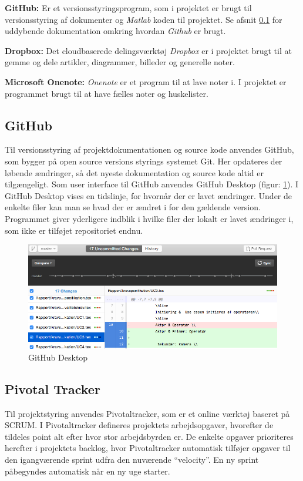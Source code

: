 \textbf{GitHub:} Er et versionsstyringsprogram, som i projektet er brugt til versionsstyring af dokumenter og \textit{Matlab} koden til projektet. Se afsnit \ref{subsec:GitHub1} for uddybende dokumentation omkring hvordan \textit{Github} er brugt.

\textbf{Dropbox:} Det cloudbaserede delingsværktøj \textit{Dropbox} er i projektet brugt til at gemme og dele artikler, diagrammer, billeder og generelle noter.

\textbf{Microsoft Onenote:} \textit{Onenote} er et program til at lave noter i. I projektet er programmet brugt til at have fælles noter og huskelister.

\subsection{GitHub}
\label{subsec:GitHub1}
Til versionsstyring af projektdokumentationen og source kode anvendes GitHub, som bygger på open source versions styrings systemet Git. Her opdateres der løbende ændringer, så det nyeste dokumentation og source kode altid er tilgængeligt. 
Som user interface til GitHub anvendes GitHub Desktop (figur: \ref{fig:git}). I GitHub Desktop vises en tidslinje, for hvornår der er lavet ændringer. Under de enkelte filer kan man se hvad der er ændret i for den gældende version. Programmet giver yderligere indblik i hvilke filer der lokalt er lavet ændringer i, som ikke er tilføjet repositoriet endnu.
\begin{figure}[H]
	\centering
	\includegraphics[width=1\textwidth]{billeder/github.png}
	\caption{GitHub Desktop}
	\label{fig:git}
\end{figure}

\newpage

\subsection{Pivotal Tracker}
\label{subsec:pivotalT}
Til projektstyring anvendes Pivotaltracker, som er et online værktøj baseret på SCRUM. I Pivotaltracker defineres projektets arbejdsopgaver, hvorefter de tildeles point alt efter hvor stor arbejdsbyrden er. De enkelte opgaver prioriteres herefter i projektets backlog, hvor Pivotaltracker automatisk tilføjer opgaver til den igangværende sprint udfra den nuværende “velocity”. En ny sprint påbegyndes automatisk når en ny uge starter.

